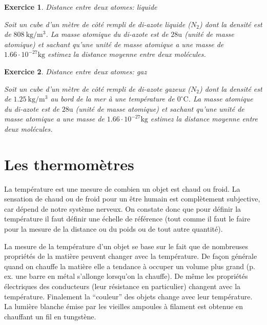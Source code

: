 \documentclass[a4paper,12pt]{book}
\newtheorem{exercice}{Exercice}
\newcommand{\m}{\mathrm{m}}
\newcommand{\kg}{\mathrm{kg}}
\newcommand{\C}{\mathrm{C}}
\begin{document}
\begin{exercice}{Distance entre deux atomes: liquide}

Soit un cube d'un mètre de côté rempli de di-azote liquide ($N_2$) dont la densité est de 
$808\ \kg/\m^3$. La masse atomique du di-azote est de $28\mathrm{u}$ (unité de masse atomique) et 
sachant qu'une unité de masse atomique a une masse de $1.66\cdot 10^{-27}\kg$ estimez
la distance moyenne entre deux molécules.
\end{exercice}

\begin{exercice}{Distance entre deux atomes: gaz}

Soit un cube d'un mètre de côté rempli de di-azote gazeux ($N_2$) dont la densité est de 
$1.25\ \kg/\m^3$ au bord de la mer à une température de $0^\circ\C$. La masse atomique du di-azote est de $28\mathrm{u}$ (unité de masse atomique) et 
sachant qu'une unité de masse atomique a une masse de $1.66\cdot 10^{-27}\kg$ estimez
la distance moyenne entre deux molécules.
\end{exercice}

\section{Les thermomètres}

La température est une mesure de combien un objet est chaud ou froid. La sensation de chaud ou de froid pour un être humain
est complètement subjective, car dépend de notre système nerveux. On constate donc que pour définir la température il faut définir une 
échelle de référence (tout comme il faut le faire pour la mesure de la distance ou du poids ou de tout autre quantité).

La mesure de la température d'un objet se base sur le fait que de nombreuses propriétés
de la matière peuvent changer avec la température. De façon générale quand on chauffe la matière elle a tendance à occuper un volume plus grand (p. ex. une barre en métal s'allonge lorsqu'on la chauffe). De même les propriétés électriques des conducteurs (leur résistance en particulier) changent avec la température. Finalement la ``couleur'' des objets change avec leur température. La lumière blanche émise par les vieilles ampoules à filament
est obtenue en chauffant un fil en tungstène. 
\end{document}
